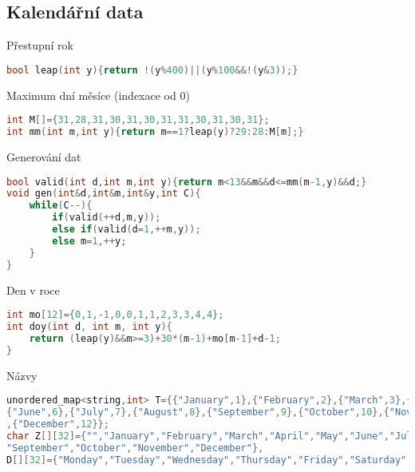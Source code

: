 \documentclass[11pt]{article}
\begin{document}
\subsection{Kalendářní data}
\begin{center}
Přestupní rok
\end{center}
\begin{lstlisting}[language=C++]
bool leap(int y){return !(y%400)||(y%100&&!(y&3));}
\end{lstlisting}
\begin{center}
Maximum dní měsíce (indexace od 0)
\end{center}
\begin{lstlisting}[language=C++]
int M[]={31,28,31,30,31,30,31,31,30,31,30,31};
int mm(int m,int y){return m==1?leap(y)?29:28:M[m];}
\end{lstlisting}
\begin{center}
Generování dat
\end{center}
\begin{lstlisting}[language=C++]
bool valid(int d,int m,int y){return m<13&&m&&d<=mm(m-1,y)&&d;}
void gen(int&d,int&m,int&y,int C){
    while(C--){
        if(valid(++d,m,y));
        else if(valid(d=1,++m,y));
        else m=1,++y;
    }
}
\end{lstlisting}
\begin{center}
Den v roce
\end{center}
\begin{lstlisting}[language=C++]
int mo[12]={0,1,-1,0,0,1,1,2,3,3,4,4};
int doy(int d, int m, int y){
    return (leap(y)&&m>=3)+30*(m-1)+mo[m-1]+d-1;
}
\end{lstlisting}
\begin{center}
Názvy
\end{center}
\begin{lstlisting}[language=C++]
unordered_map<string,int> T={{"January",1},{"February",2},{"March",3},{"April",4},{"May",5},
{"June",6},{"July",7},{"August",8},{"September",9},{"October",10},{"November",11}
,{"December",12}};
char Z[][32]={"","January","February","March","April","May","June","July","August",
"September","October","November","December"},
D[][32]={"Monday","Tuesday","Wednesday","Thursday","Friday","Saturday","Sunday"};
\end{lstlisting}
\end{document}
